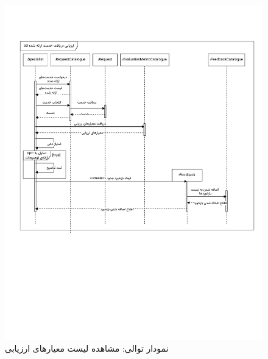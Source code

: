 \begin{figure}[ht!]
	\centering
	\includegraphics[scale=0.8, page=2]{figs/OOD-Sequence-3.pdf}
	\caption{نمودار توالی: مشاهده لیست معیارهای ارزیابی}
\end{figure}
\FloatBarrier
\newpage

